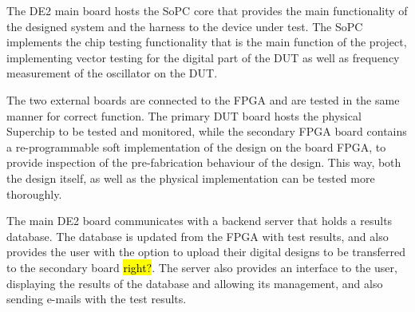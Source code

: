 The DE2 main board hosts the SoPC core that provides the main functionality of the designed system and the harness to the device under test. The SoPC implements the chip testing functionality that is the main function of the project, implementing vector testing for the digital part of the DUT as well as frequency measurement of the oscillator on the DUT.

The two external boards are connected to the FPGA and are tested in the same manner for correct function. The primary DUT board hosts the physical Superchip to be tested and monitored, while the secondary FPGA board contains a re-programmable soft implementation of the design on the board FPGA, to provide inspection of the pre-fabrication behaviour of the design. This way, both the design itself, as well as the physical implementation can be tested more thoroughly.

The main DE2 board communicates with a backend server that holds a results database. The database is updated from the FPGA with test results, and also provides the user with the option to upload their digital designs to be transferred to the secondary board \hl{right?}. The server also provides an interface to the user, displaying the results of the database and allowing its management, and also sending e-mails with the test results.










